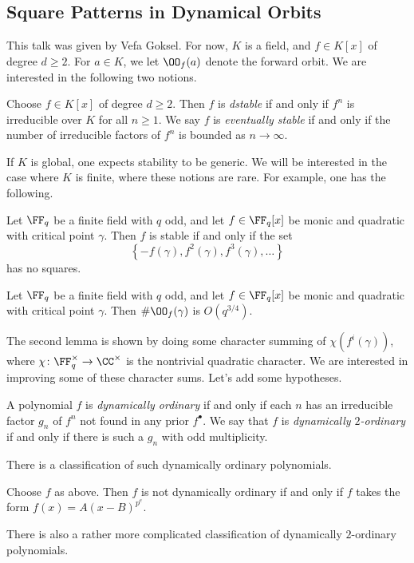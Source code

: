 \documentclass{article}
\begin{document}
\subsection{Square Patterns in Dynamical Orbits}
This talk was given by Vefa Goksel. For now, $K$ is a field, and $f\in K[x]$ of degree $d\ge2$. For $a\in K$, we let $\OO_f(a)$ denote the forward orbit. We are interested in the following two notions.
\begin{definition}
	Choose $f\in K[x]$ of degree $d\ge2$. Then $f$ is \textit{dstable} if and only if $f^n$ is irreducible over $K$ for all $n\ge1$. We say $f$ is \textit{eventually stable} if and only if the number of irreducible factors of $f^n$ is bounded as $n\to\infty$.
\end{definition}
If $K$ is global, one expects stability to be generic. We will be interested in the case where $K$ is finite, where these notions are rare. For example, one has the following.
\begin{lemma}
	Let $\FF_q$ be a finite field with $q$ odd, and let $f\in\FF_q[x]$ be monic and quadratic with critical point $\gamma$. Then $f$ is stable if and only if the set
	\[\left\{-f(\gamma),f^2(\gamma),f^3(\gamma),\ldots\right\}\]
	has no squares.
\end{lemma}
\begin{lemma}
	Let $\FF_q$ be a finite field with $q$ odd, and let $f\in\FF_q[x]$ be monic and quadratic with critical point $\gamma$. Then $\#\OO_f(\gamma)$ is $O(q^{3/4})$.
\end{lemma}
The second lemma is shown by doing some character summing of $\chi(f^i(\gamma))$, where $\chi\colon\FF_q^\times\to\CC^\times$ is the nontrivial quadratic character. We are interested in improving some of these character sums. Let's add some hypotheses.
\begin{definition}
	A polynomial $f$ is \textit{dynamically ordinary} if and only if each $n$ has an irreducible factor $g_n$ of $f^n$ not found in any prior $f^\bullet$. We say that $f$ is \textit{dynamically $2$-ordinary} if and only if there is such a $g_n$ with odd multiplicity.
\end{definition}
There is a classification of such dynamically ordinary polynomials. 
\begin{proposition}
	Choose $f$ as above. Then $f$ is not dynamically ordinary if and only if $f$ takes the form $f(x)=A(x-B)^{p^e}$.
\end{proposition}
There is also a rather more complicated classification of dynamically $2$-ordinary polynomials.
\end{document}

